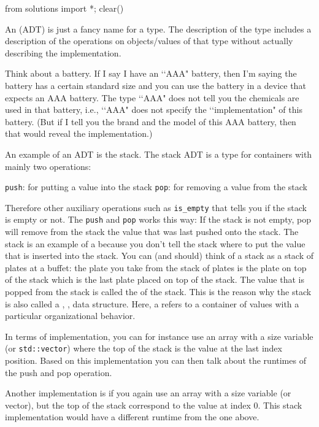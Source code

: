 \begin{python0}
from solutions import *; clear()
\end{python0}

An  (ADT) is just a fancy name for a type.
The description of the type includes a description of the operations on
objects/values of that type without actually describing the implementation.

Think about a battery.
If I say I have an \lq\lq AAA" battery, then I'm saying the battery has
a certain standard size and 
you can use the battery in a device that
expects an AAA battery.
The type \lq\lq AAA" does not tell you the chemicals are used in that
battery, i.e., \lq\lq AAA" does not specify the \lq\lq implementation"
of this battery.
(But if I tell you the brand and the model of this AAA battery, then
that would reveal the implementation.)

An example of an ADT is the stack.
The stack ADT is a type for containers with
mainly two operations:
\begin{tightlist}
  \li \verb!push!: for putting a value into the stack
  \li \verb!pop!: for removing a value from the stack
\end{tightlist}
Therefore other auxiliary operations such as
\verb!is_empty!
that tells you if the stack is empty or not.
The \verb!push! and \verb!pop! works this way:
If the stack is not empty, pop will remove from the stack
the value that was
last pushed onto the stack.
The stack is an example of a
because you
don't tell the stack where to put the value that is inserted into the stack.
You can (and should) think of a stack as a stack of plates at a buffet:
the plate you take from the stack of plates is the plate on top of the stack
which is the last plate placed on top of the stack.
The value that is popped from the stack is called the
of the stack.
This is the reason why the stack is also called a
,
,
data structure.
Here, a
refers to a container of values with a particular
organizational behavior.

In terms of implementation, you can for instance use an array with a size
variable (or \verb!std::vector!)
where the top of the stack is the value at the last index position.
Based on this implementation you can then talk about the runtimes of the
push and pop operation.

Another implementation is if you again use an array with a size variable
(or vector), but the top of the stack correspond to the value at index 0.
This stack implementation would have a different runtime from the one
above.


